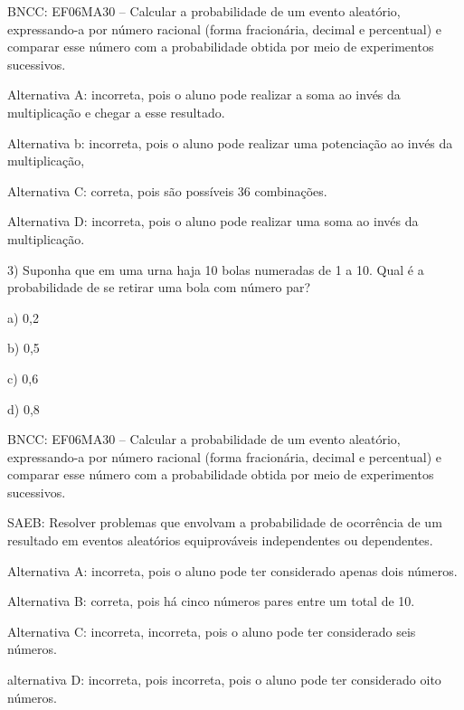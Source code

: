 BNCC: EF06MA30 -- Calcular a probabilidade de um evento aleatório,
expressando-a por número racional (forma fracionária, decimal e
percentual) e comparar esse número com a probabilidade obtida por meio
de experimentos sucessivos.

Alternativa A: incorreta, pois o aluno pode realizar a soma ao invés da
multiplicação e chegar a esse resultado.

Alternativa b: incorreta, pois o aluno pode realizar uma potenciação ao
invés da multiplicação,

Alternativa C: correta, pois são possíveis 36 combinações.

Alternativa D: incorreta, pois o aluno pode realizar uma soma ao invés
da multiplicação.

3) Suponha que em uma urna haja 10 bolas numeradas de 1 a 10. Qual é a
probabilidade de se retirar uma bola com número par?

a) 0,2

b) 0,5

c) 0,6

d) 0,8

BNCC: EF06MA30 -- Calcular a probabilidade de um evento aleatório,
expressando-a por número racional (forma fracionária, decimal e
percentual) e comparar esse número com a probabilidade obtida por meio
de experimentos sucessivos.

SAEB: Resolver problemas que envolvam a probabilidade de ocorrência de
um resultado em eventos aleatórios equiprováveis independentes ou
dependentes.

Alternativa A: incorreta, pois o aluno pode ter considerado apenas dois
números.

Alternativa B: correta, pois há cinco números pares entre um total de
10.

Alternativa C: incorreta, incorreta, pois o aluno pode ter considerado
seis números.

alternativa D: incorreta, pois incorreta, pois o aluno pode ter
considerado oito números.